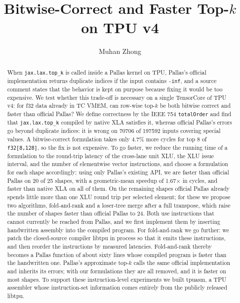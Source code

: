 \documentclass[sigconf,nonacm,balance=false]{acmart}
\newcommand{\code}[1]{\texttt{#1}}
\begin{document}
\title{\texorpdfstring{Bitwise-Correct and Faster Top-$k$ on TPU v4}{Bitwise-Correct and Faster Top-k on TPU v4}}

\author{Muhan Zhong}

\begin{abstract}
When \code{jax.\allowbreak{}lax.\allowbreak{}top\_\allowbreak{}k} is called inside a Pallas kernel on TPU, Pallas's official implementation returns duplicate indices if the input contains \code{-inf}, and a source comment states that the behavior is kept on purpose because fixing it would be too expensive. We test whether this trade-off is necessary on a single TensorCore of TPU v4: for f32 data already in TC VMEM, can row-wise top-$k$ be both bitwise correct and faster than official Pallas? We define correctness by the IEEE 754 \code{total\allowbreak{}Order} and find that \code{jax.\allowbreak{}lax.\allowbreak{}top\_\allowbreak{}k} compiled by native XLA satisfies it, whereas official Pallas's errors go beyond duplicate indices: it is wrong on 70706 of 197592 inputs covering special values. A bitwise-correct formulation takes only 4.7\% more cycles for top 8 of \code{f32[8,\allowbreak{}128]}, so the fix is not expensive. To go faster, we reduce the running time of a formulation to the round-trip latency of the cross-lane unit XLU, the XLU issue interval, and the number of elementwise vector instructions, and choose a formulation for each shape accordingly: using only Pallas's existing API, we are faster than official Pallas on 20 of 25 shapes, with a geometric-mean speedup of 1.67$\times$ in cycles, and faster than native XLA on all of them. On the remaining shapes official Pallas already spends little more than one XLU round trip per selected element; for these we propose two algorithms, fold-and-rank and a loser-tree merge after a full transpose, which raise the number of shapes faster than official Pallas to 24. Both use instructions that cannot currently be reached from Pallas, and we first implement them by inserting handwritten assembly into the compiled program. For fold-and-rank we go further: we patch the closed-source compiler libtpu in process so that it emits these instructions, and then reorder the instructions by measured latencies. Fold-and-rank thereby becomes a Pallas function of about sixty lines whose compiled program is faster than the handwritten one. Pallas's approximate top-$k$ calls the same official implementation and inherits its errors; with our formulations they are all removed, and it is faster on most shapes. To support these instruction-level experiments we built tpuasm, a TPU assembler whose instruction-set information comes entirely from the publicly released libtpu.
\end{abstract}
\end{document}
